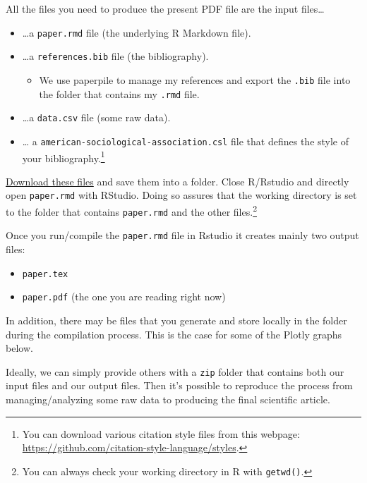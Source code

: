 \documentclass[
  12pt,
]{article}
\providecommand{\tightlist}{%
  \setlength{\itemsep}{0pt}\setlength{\parskip}{0pt}}
\begin{document}
All the files you need to produce the present PDF file are the input files\ldots{}

\begin{itemize}
\tightlist
\item
  \ldots a \texttt{paper.rmd} file (the underlying R Markdown file).
\item
  \ldots a \texttt{references.bib} file (the bibliography).

  \begin{itemize}
  \tightlist
  \item
    We use paperpile to manage my references and export the \texttt{.bib} file into the folder that contains my \texttt{.rmd} file.
  \end{itemize}
\item
  \ldots a \texttt{data.csv} file (some raw data).
\item
  \ldots{} a \texttt{american-sociological-association.csl} file that defines the style of your bibliography.\footnote{You can download various citation style files from this webpage: \url{https://github.com/citation-style-language/styles}.}
\end{itemize}

\href{https://drive.google.com/drive/folders/1zJP3cNPrHN-gj0rcmbHQgg-XA0hqDXdd?usp=sharing}{Download these files} and save them into a folder. Close R/Rstudio and directly open \texttt{paper.rmd} with RStudio. Doing so assures that the working directory is set to the folder that contains \texttt{paper.rmd} and the other files.\footnote{You can always check your working directory in R with \texttt{getwd()}.}

Once you run/compile the \texttt{paper.rmd} file in Rstudio it creates mainly two output files:

\begin{itemize}
\tightlist
\item
  \texttt{paper.tex}
\item
  \texttt{paper.pdf} (the one you are reading right now)
\end{itemize}

In addition, there may be files that you generate and store locally in the folder during the compilation process. This is the case for some of the Plotly graphs below.

Ideally, we can simply provide others with a \texttt{zip} folder that contains both our input files and our output files. Then it's possible to reproduce the process from managing/analyzing some raw data to producing the final scientific article.
\end{document}
